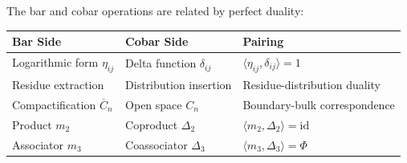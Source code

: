 \begin{theorem}\label{thm:verdier-duality-operations}
The bar and cobar operations are related by perfect duality:

\begin{center}
\begin{tabular}{|l|l|l|}
\hline
\textbf{Bar Side} & \textbf{Cobar Side} & \textbf{Pairing} \\
\hline
Logarithmic form $\eta_{ij}$ & Delta function $\delta_{ij}$ & $\langle \eta_{ij}, \delta_{ij} \rangle = 1$ \\
Residue extraction & Distribution insertion & Residue-distribution duality \\
Compactification $\overline{C}_n$ & Open space $C_n$ & Boundary-bulk correspondence \\
Product $m_2$ & Coproduct $\Delta_2$ & $\langle m_2, \Delta_2 \rangle = \mathrm{id}$ \\
Associator $m_3$ & Coassociator $\Delta_3$ & $\langle m_3, \Delta_3 \rangle = \Phi$ \\
\hline
\end{tabular}
\end{center}
\end{theorem}

